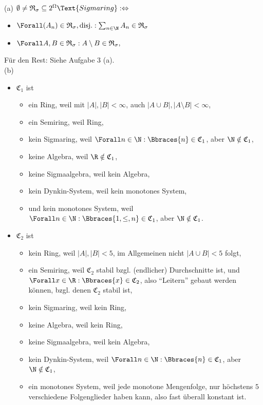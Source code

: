 \begin{solution}

(a) $\emptyset \neq \mathfrak{R}_\sigma \subseteq 2^\Omega \Text{Sigmaring} : \Leftrightarrow$
\begin{itemize}
  \item $\Forall (A_n) \in \mathfrak{R}_\sigma, \text{disj.}: \sum_{n \in \N} A_n \in \mathfrak{R}_\sigma$
  \item $\Forall A, B \in \mathfrak{R}_\sigma: A \setminus B \in \mathfrak{R}_\sigma,$
\end{itemize}

Für den Rest: Siehe Aufgabe 3 (a). \\

(b)

\begin{itemize}

  \item $\mathfrak{C}_1$ ist
  \begin{itemize}
    \item ein Ring, weil mit $|A|, |B| < \infty$, auch $|A \cup B|, |A \setminus B| < \infty$,
    \item ein Semiring, weil Ring,
    \item kein Sigmaring, weil $\Forall n \in \N: \Bbraces{n} \in \mathfrak{C}_1$, aber $\N \notin \mathfrak{C}_1$,
    \item keine Algebra, weil $\R \notin \mathfrak{C}_1$,
    \item keine Sigmaalgebra, weil kein Algebra,
    \item kein Dynkin-System, weil kein monotones System,
    \item und kein monotones System, weil $\Forall n \in \N: \Bbraces{1, \leq, n} \in \mathfrak{C}_1$, aber $\N \notin \mathfrak{C}_1$.
  \end{itemize}

  \item$\mathfrak{C}_2$ ist
  \begin{itemize}
    \item kein Ring, weil $|A|, |B| < 5$, im Allgemeinen nicht $|A \cup B| < 5$ folgt,
    \item ein Semiring, weil $\mathfrak{C}_2$ stabil bzgl. (endlicher) Durchschnitte ist, und $\Forall x \in \R: \Bbraces{x} \in \mathfrak{C}_2$, also \enquote{Leitern} gebaut werden können, bzgl. denen $\mathfrak{C}_2$ stabil ist,
    \item kein Sigmaring, weil kein Ring,
    \item keine Algebra, weil kein Ring,
    \item keine Sigmaalgebra, weil kein Algebra,
    \item kein Dynkin-System, weil $\Forall n \in \N: \Bbraces{n} \in \mathfrak{C}_1$, aber $\N \notin \mathfrak{C}_1$,
    \item ein monotones System, weil jede monotone Mengenfolge, nur höchstens $5$ verschiedene Folgenglieder haben kann, also fast überall konstant ist.
  \end{itemize}


\end{itemize}
\end{solution}
